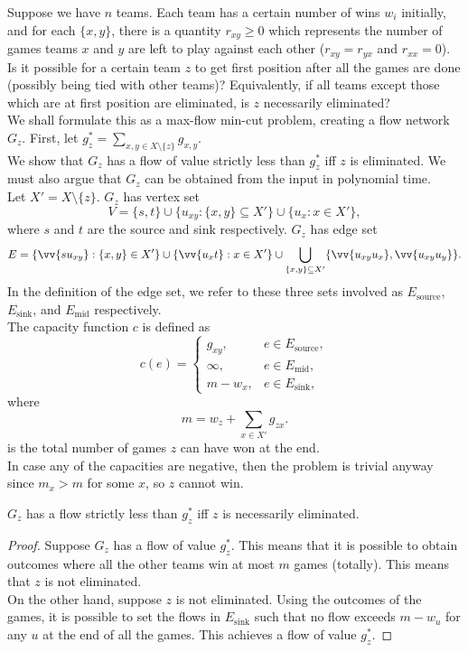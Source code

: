 		Suppose we have $n$ teams. Each team has a certain number of wins $w_i$ initially, and for each $\{x,y\}$, there is a quantity $r_{xy}\geq 0$ which represents the number of games teams $x$ and $y$ are left to play against each other ($r_{xy} = r_{yx}$ and $r_{xx}=0$). Is it possible for a certain team $z$ to get first position after all the games are done (possibly being tied with other teams)? Equivalently, if all teams except those which are at first position are eliminated, is $z$ necessarily eliminated?\\

		We shall formulate this as a max-flow min-cut problem, creating a flow network $G_z$. First, let $g_z^* = \sum_{x,y \in X\setminus\{z\}} g_{x,y}$.\\
		We show that $G_z$ has a flow of value strictly less than $g_z^*$ iff $z$ is eliminated. We must also argue that $G_z$ can be obtained from the input in polynomial time.\\

		Let $X' = X \setminus \{z\}$. $G_z$ has vertex set
		\[ V = \{s,t\} \cup \{u_{xy} : \{x,y\}\subseteq X'\} \cup \{u_x : x \in X'\}, \]
		where $s$ and $t$ are the source and sink respectively. $G_z$ has edge set
		\[ E = \{\vv{s u_{xy}} : \{x,y\}\in X'\} \cup \{\vv{u_x t} : x \in X'\} \cup \bigcup_{\{x,y\}\subseteq X'} \{\vv{u_{xy}u_x},\vv{u_{xy}u_y}\}. \]
		In the definition of the edge set, we refer to these three sets involved as $E_\text{source}$, $E_\text{sink}$, and $E_\text{mid}$ respectively.\\
		The capacity function $c$ is defined as
		\[
			c(e) =
			\begin{cases}
				g_{xy}, & e \in E_\text{source}, \\
				\infty, & e \in E_\text{mid}, \\
				m - w_x, & e \in E_\text{sink},
			\end{cases}
		\]
		where 
		\[ m = w_z + \sum_{x\in X'} g_{zx}. \]
		is the total number of games $z$ can have won at the end.\\
		In case any of the capacities are negative, then the problem is trivial anyway since $m_x > m$ for some $x$, so $z$ cannot win.

		\begin{lemma}
			$G_z$ has a flow strictly less than $g_z^*$ iff $z$ is necessarily eliminated.
		\end{lemma}
		\begin{proof}
			Suppose $G_z$ has a flow of value $g_z^*$. This means that it is possible to obtain outcomes where all the other teams win at most $m$ games (totally). This means that $z$ is not eliminated.\\
			On the other hand, suppose $z$ is not eliminated. Using the outcomes of the games, it is possible to set the flows in $E_\text{sink}$ such that no flow exceeds $m - w_u$ for any $u$ at the end of all the games. This achieves a flow of value $g_z^*$.
		\end{proof}

